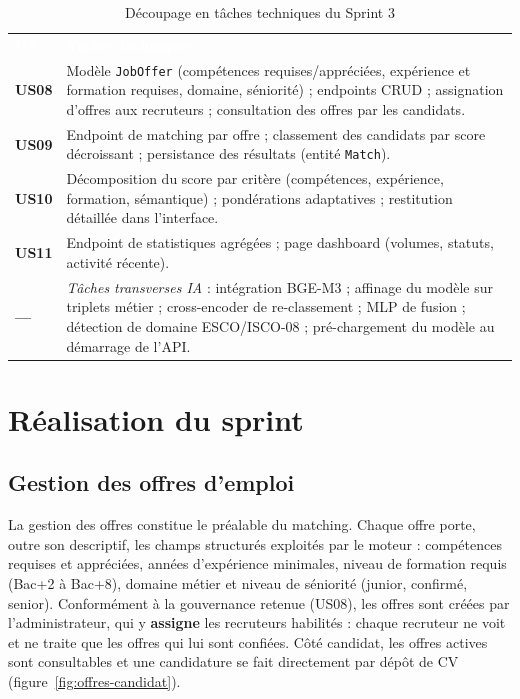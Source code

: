 \documentclass[12pt,a4paper]{report}
\begin{document}
\begin{table}[H]
\centering
\caption{Découpage en tâches techniques du Sprint 3}
\label{tab:taches-s3}
\small
\begin{tabularx}{\textwidth}{>{\bfseries}p{1.2cm} X}
\rowcolor{tabheader}
\textcolor{white}{\textbf{US}} & \textcolor{white}{\textbf{Tâches techniques}} \\
US08 & Modèle \texttt{JobOffer} (compétences requises/appréciées, expérience et formation requises, domaine, séniorité) ; endpoints CRUD ; assignation d'offres aux recruteurs ; consultation des offres par les candidats. \\
\rowcolor{tabalt}
US09 & Endpoint de matching par offre ; classement des candidats par score décroissant ; persistance des résultats (entité \texttt{Match}). \\
US10 & Décomposition du score par critère (compétences, expérience, formation, sémantique) ; pondérations adaptatives ; restitution détaillée dans l'interface. \\
\rowcolor{tabalt}
US11 & Endpoint de statistiques agrégées ; page dashboard (volumes, statuts, activité récente). \\
--- & \textit{Tâches transverses IA} : intégration BGE-M3 ; affinage du modèle sur triplets métier ; cross-encoder de re-classement ; MLP de fusion ; détection de domaine ESCO/ISCO-08 ; pré-chargement du modèle au démarrage de l'API. \\
\bottomrule
\end{tabularx}
\end{table}

\section{Réalisation du sprint}

\subsection{Gestion des offres d'emploi}

La gestion des offres constitue le préalable du matching. Chaque offre porte, outre son descriptif, les champs structurés exploités par le moteur : compétences requises et appréciées, années d'expérience minimales, niveau de formation requis (Bac+2 à Bac+8), domaine métier et niveau de séniorité (junior, confirmé, senior). Conformément à la gouvernance retenue (US08), les offres sont créées par l'administrateur, qui y \textbf{assigne} les recruteurs habilités : chaque recruteur ne voit et ne traite que les offres qui lui sont confiées. Côté candidat, les offres actives sont consultables et une candidature se fait directement par dépôt de CV (figure~\ref{fig:offres-candidat}).
\end{document}
